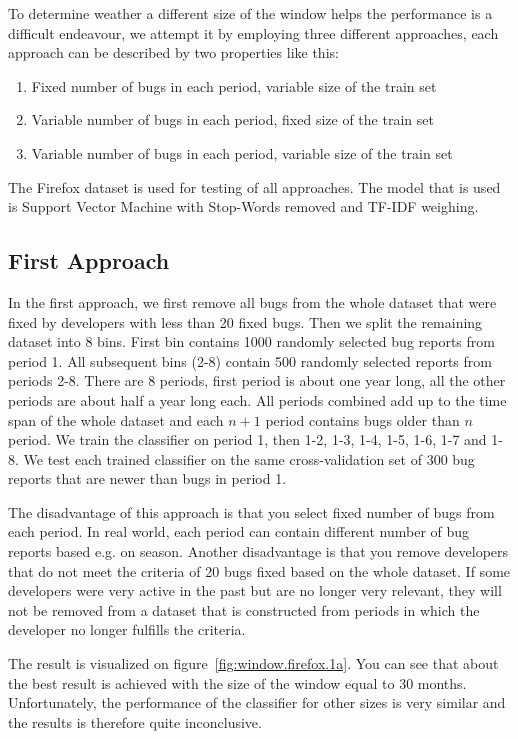To determine weather a different size of the window helps the performance is a difficult endeavour, we attempt it by employing three different approaches, each approach can be described by two properties like this:

\begin{enumerate}
 \item Fixed number of bugs in each period, variable size of the train set
 \item Variable number of bugs in each period, fixed size of the train set
 \item Variable number of bugs in each period, variable size of the train set
\end{enumerate}

The Firefox dataset is used for testing of all approaches. The model that is used is Support Vector Machine with Stop-Words removed and TF-IDF weighing.

\subsection{First Approach}

In the first approach, we first remove all bugs from the whole dataset that were fixed by developers with less than 20 fixed bugs. Then we split the remaining dataset into 8 bins. First bin contains 1000 randomly selected bug reports from period 1. All subsequent bins (2-8) contain 500 randomly selected reports from periods 2-8. There are 8 periods, first period is about one year long, all the other periods are about half a year long each. All periods combined add up to the time span of the whole dataset and each $n+1$ period contains bugs older than $n$ period. We train the classifier on period 1, then 1-2, 1-3, 1-4, 1-5, 1-6, 1-7 and 1-8. We test each trained classifier on the same cross-validation set of 300 bug reports that are newer than bugs in period 1.

The disadvantage of this approach is that you select fixed number of bugs from each period. In real world, each period can contain different number of bug reports based e.g. on season. Another disadvantage is that you remove developers that do not meet the criteria of 20 bugs fixed based on the whole dataset. If some developers were very active in the past but are no longer very relevant, they will not be removed from a dataset that is constructed from periods in which the developer no longer fulfills the criteria.

The result is visualized on figure~\ref{fig:window.firefox.1a}. You can see that about the best result is achieved with the size of the window equal to 30 months. Unfortunately, the performance of the classifier for other sizes is very similar and the results is therefore quite inconclusive.

